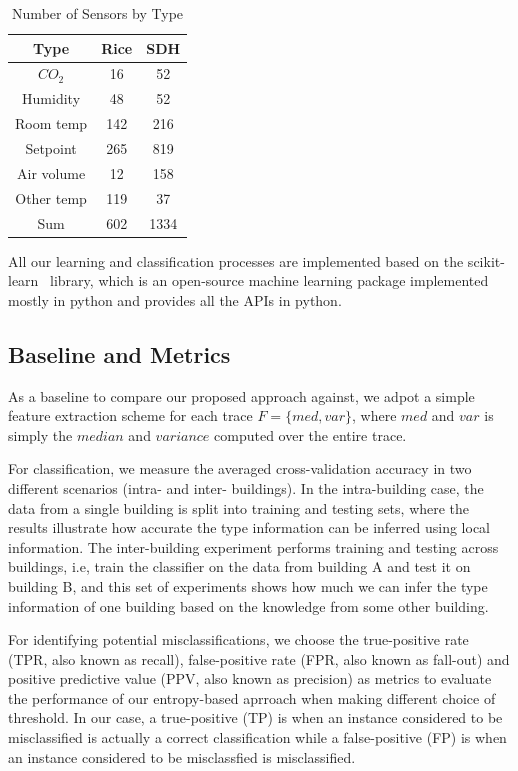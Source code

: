 \begin{table}[ht!]
\caption{Number of Sensors by Type}
\centering %
\begin{tabular}{c c c}%
\hline %
Type & Rice & SDH \\ %
\hline\hline %
$CO_{2}$ & 16 & 52 \\ %
Humidity & 48 & 52 \\
Room temp & 142 & 216 \\
Setpoint & 265 & 819 \\
Air volume & 12 & 158 \\ 
Other temp & 119 & 37 \\ \hline
Sum & 602 & 1334 \\ \hline
\end{tabular}
\label{table:num} %
\end{table}

All our learning and classification processes are implemented based on the scikit-learn~\cite{scikit} library, which is an open-source machine learning package implemented mostly in python and provides all the APIs in python.

\subsection{Baseline and Metrics}
As a baseline to compare our proposed approach against, we adpot a simple feature extraction scheme for each trace $F=\{med, var\}$, where $med$ and $var$ is simply the $median$ and $variance$ computed over the entire trace.

For classification, we measure the averaged cross-validation accuracy in two different scenarios (intra- and inter- buildings). In the intra-building case, the 
data from a single building is split into training and testing sets, where the results illustrate how accurate the type information can be inferred using local 
information. The inter-building experiment performs training and testing across buildings, i.e, train the classifier on the data from building A and test it 
on building B, and this set of experiments shows how much we can infer the type information of one building based on the knowledge from some other building.

For identifying potential misclassifications, we choose the true-positive rate (TPR, also known as recall), false-positive rate (FPR, also known as fall-out) and positive predictive 
value (PPV, also known as precision) as metrics to evaluate the performance of our entropy-based aprroach when making different choice of threshold. In our 
case, a true-positive (TP) is when an instance considered to be misclassified is actually a correct classification while a false-positive (FP) is when an instance 
considered to be misclassfied is misclassified.

